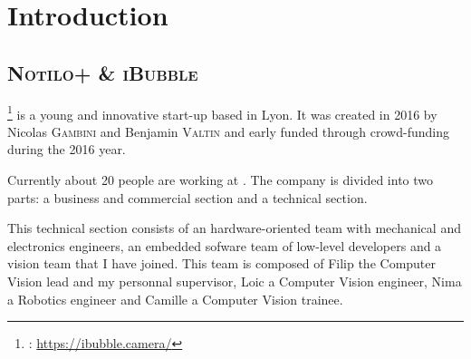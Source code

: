 
\chapter{Introduction} %

\label{Introduction} %


\newcommand{\keyword}[1]{\textbf{#1}}
\newcommand{\tabhead}[1]{\textbf{#1}}
\newcommand{\code}[1]{\texttt{\hl{#1}}}
\newcommand{\file}[1]{\texttt{\bfseries#1}}
\newcommand{\option}[1]{\texttt{\itshape#1}}
\newcommand{\iBubble}{\textsc{iBubble}}
\newcommand{\rasp}{\textsc{Raspberry Pi}}
\newcommand{\vc}{\textsc{VideoCore iv 3D}}
\newcommand{\cpu}{\textsc{arm cpu}}
\newcommand{\bcm}{\textsc{bcm2837}}
\newcommand{\qpu}{\textsc{qpu}}
\newcommand{\flow}{\textsc{optical flow}}
\newcommand{\feat}{\textsc{feature}}
\newcommand{\api}{\textsc{api}}
\newcommand{\ram}{\textsc{shared ram}}
\newcommand{\mail}{\textsc{mailbox}}


\section{\textsc{Notilo+} \& \textsc{iBubble}}

\footnote{\groupname{}: \url{https://ibubble.camera/}}\groupname{} is a young and innovative start-up based in Lyon. It was created in 2016 by Nicolas \textsc{Gambini} and Benjamin \textsc{Valtin} and early funded through crowd-funding during the 2016 year.

Currently about 20 people are working at \groupname{}. The company is divided into two parts: a business and commercial section and a technical section.

This technical section consists of an hardware-oriented team with mechanical and electronics engineers, an embedded sofware team of low-level developers and a vision team that I have joined. This team is composed of Filip the Computer Vision lead and my personnal supervisor, Loic a Computer Vision engineer, Nima a Robotics engineer and Camille a Computer Vision trainee.

